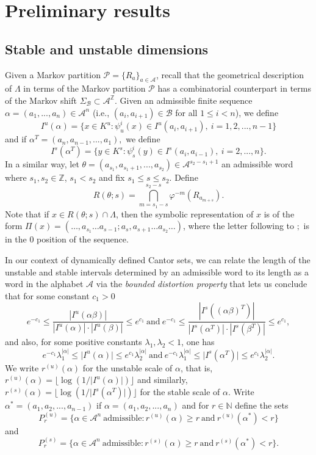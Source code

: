 \documentclass[12pt]{amsart}
\providecommand{\abs}[1]{\lvert#1\rvert}
\theoremstyle{plain} %
\theoremstyle{definition} %
\numberwithin{equation}{section}
\begin{document}
\section{Preliminary results} \label{pre}
\subsection{Stable and unstable dimensions}
Given a Markov partition $\mathcal{P}=\{R_a\}_{a\in \mathcal{A}}$, recall that the geometrical description of $\Lambda$ in terms of the Markov partition $\mathcal{P}$ has a combinatorial counterpart in terms of the Markov shift $\Sigma_{\mathcal{B}}\subset \mathcal{A}^{\mathbb{Z}}$.
Given an admissible finite sequence $\alpha=(a_1,...,a_n)\in \mathcal{A}^n$ (i.e., $(a_i,a_{i+1})\in \mathcal{B}$ for all $1\le i<n$), we define
	$$I^u(\alpha)=\{x\in K^u: \psi_u^i(x)\in I^u(a_i,a_{i+1}),\ i=1,2,...,n-1\}$$
and if $\alpha^T=(a_n,a_{n-1},...,a_1),$ we define
	$$I^s(\alpha^T)=\{y\in K^s: \psi_s^i(y)\in I^s(a_{i},a_{i-1}),\ i=2,...,n\}.$$
In a similar way, let $\theta=(a_{s_1},a_{s_1+1},...,a_{s_2})\in \mathcal{A}^{s_2-s_1+1}$ an admissible word where $s_1, s_2 \in \mathbb{Z}$, $s_1 < s_2$ and fix $s_1\le s\le s_2$. Define $$R(\theta;s)=\bigcap_{m=s_1-s}^{s_2-s} \varphi^{-m}(R_{a_{m+s}}).$$
Note that if $x\in R(\theta;s)\cap \Lambda$, then the symbolic representation of $x$ is of the form $\Pi(x)=(\dots,a_{s_1}\dots a_{s-1};a_{s},a_{s+1}\dots a_{s_2}\dots)$, where the letter following to $;$ is in the $0$ position of the sequence.

In our context of dynamically defined Cantor sets, we can relate the length of the unstable and stable intervals determined by an admissible word to its length as a word in the alphabet $\mathcal{A}$ via the {\it bounded distortion property} that lets us conclude that for some constant $c_1>0$
\begin{equation}\label{bdp1}
	e^{-c_1}\le \dfrac{|I^u(\alpha\beta)|}{|I^u(\alpha)|\cdot|I^u(\beta)|}\le e^{c_1} \ \mbox{and} \ e^{-c_1}\le \dfrac{|I^s((\alpha\beta)^T)|}{|I^s(\alpha^T)|\cdot|I^s(\beta^T)|}\le e^{c_1},
	\end{equation}
and also, for some positive constants $\lambda_1,\lambda_2<1$, one has
\begin{equation}\label{bdp2}
	e^{-c_1} \lambda_1^{\abs{\alpha}}\leq\abs{I^u(\alpha)}\leq e^{c_1} \lambda_2^{\abs{\alpha}} \ \mbox{and} \ e^{-c_1} \lambda_1^{\abs{\alpha}}\leq\abs{I^s(\alpha^T)}\leq e^{c_1} \lambda_2^{\abs{\alpha}}.
	\end{equation}
We write $r^{(u)}(\alpha)$ for the unstable scale of $\alpha$, that is, $r^{(u)}(\alpha)=\lfloor \log(1/\abs{I^u(\alpha)})\rfloor$ and similarly, $r^{(s)}(\alpha) =\lfloor \log(1/\abs{I^s(\alpha^T)})\rfloor$ for the stable scale of $\alpha$. 
Write $\alpha^{\ast}=(a_1,a_2,...,a_{n-1})$ if $\alpha=(a_1,a_2,...,a_n)$ and for $r\in \mathbb{N}$ define the sets
$$P^{(u)}_r=\{\alpha\in \mathcal{A}^n \ \mbox{admissible}:  r^{(u)}(\alpha)\geq r \ \mbox{and} \ r^{(u)}(\alpha^{\ast})<r\}$$
and
$$P^{(s)}_r=\{\alpha\in \mathcal{A}^n \ \mbox{admissible}:  r^{(s)}(\alpha)\ge r \ \mbox{and} \ r^{(s)}(\alpha^{\ast})<r\}.$$
\end{document}
